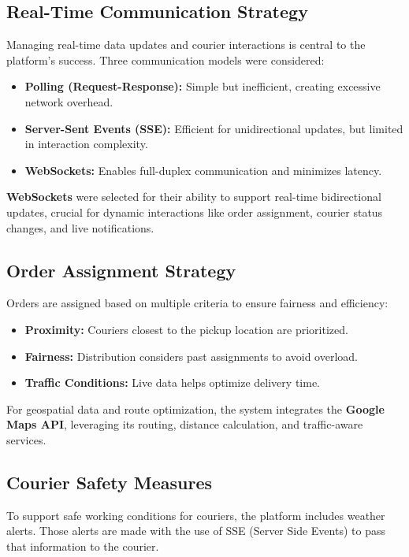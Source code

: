 \subsection{Real-Time Communication Strategy}

Managing real-time data updates and courier interactions is central to the platform’s success. Three communication models were considered:

\begin{itemize}
    \item \textbf{Polling (Request-Response):} Simple but inefficient, creating excessive network overhead.
    \item \textbf{Server-Sent Events (SSE):} Efficient for unidirectional updates, but limited in interaction complexity.
    \item \textbf{WebSockets:} Enables full-duplex communication and minimizes latency.
\end{itemize}

\textbf{WebSockets} were selected for their ability to support real-time bidirectional updates, crucial for dynamic interactions like order assignment, courier status changes, and live notifications.

\subsection{Order Assignment Strategy}

Orders are assigned based on multiple criteria to ensure fairness and efficiency:

\begin{itemize}
    \item \textbf{Proximity:} Couriers closest to the pickup location are prioritized.
    \item \textbf{Fairness:} Distribution considers past assignments to avoid overload.
    \item \textbf{Traffic Conditions:} Live data helps optimize delivery time.
\end{itemize}

For geospatial data and route optimization, the system integrates the \textbf{Google Maps API}, leveraging its routing, distance calculation, and traffic-aware services.

\subsection{Courier Safety Measures}

To support safe working conditions for couriers, the platform includes weather alerts. Those alerts are made with the use of SSE (Server Side Events) to pass that information to the courier.
